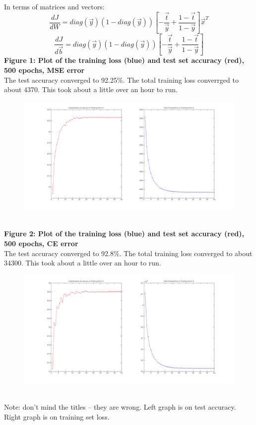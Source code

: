 \documentclass[11pt]{article}
\begin{document}
In terms of matrices and vectors:
$$ \boxed{\frac{dJ} {dW} = diag(\vec{y}) (1 - diag(\vec{y})) [ - \frac{\vec{t}}{\vec{y}} + \frac{ 1 - \vec{t}}{1 - \vec{y}} ] \vec{x}^T} $$
$$ \boxed{\frac{dJ} {d\vec{b}} = diag(\vec{y}) (1 - diag(\vec{y})) [ - \frac{\vec{t}}{\vec{y}} + \frac{ 1 - \vec{t}}{1 - \vec{y}} ]} $$
\textbf{Figure 1: Plot of the training loss (blue) and test set accuracy (red), 500 epochs, MSE error}  \\
The test accuracy converged to 92.25\%. The total training loss converrged to about 4370. This took about a little over an hour to run.
\begin{figure}[ht!]
\centering
\includegraphics[width=150mm]{plots/finalp1mse.png}
\label{overflow}
\end{figure}
\\
\textbf{Figure 2: Plot of the training loss (blue) and test set accuracy (red), 500 epochs, CE error} \\
The test accuracy converged to 92.8\%. The total training loss converged to about 34300. This took about a little over an hour to run.
\begin{figure}[ht!]
\centering
\includegraphics[width=150mm]{plots/finalp1ce.png}
\label{overflow}
\end{figure}
\\
Note: don't mind the titles -- they are wrong. Left graph is on test accuracy. Right graph is on training set loss.
\end{document}
